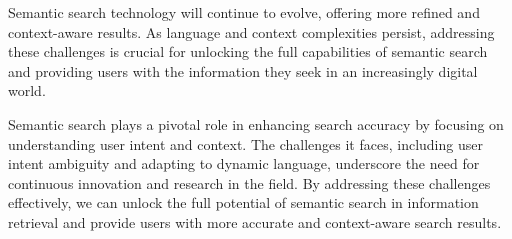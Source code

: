 \documentclass[10pt,oneside,a4paper]{article}
\begin{document}
Semantic search technology will continue to evolve, offering more refined and context-aware results. As language and context complexities persist, addressing these challenges is crucial for unlocking the full capabilities of semantic search and providing users with the information they seek in an increasingly digital world.

Semantic search plays a pivotal role in enhancing search accuracy by focusing on understanding user intent and context. The challenges it faces, including user intent ambiguity and adapting to dynamic language, underscore the need for continuous innovation and research in the field. By addressing these challenges effectively, we can unlock the full potential of semantic search in information retrieval and provide users with more accurate and context-aware search results.

\newpage
\nocite{*}


\end{document}
